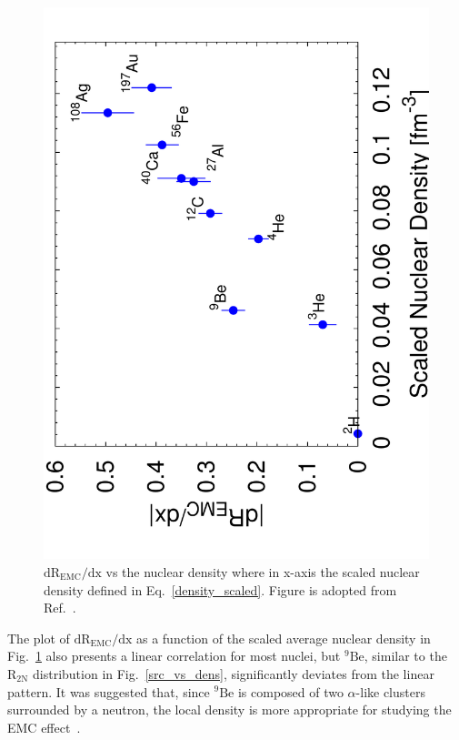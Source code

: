    \begin{figure}[!ht]
  \begin{center}
    \includegraphics[type=pdf,ext=.pdf,read=.pdf,angle=270,width=0.6\linewidth]{./figures/physics/emc_vs_dens_scaled}
   \caption[$\mathrm{dR_{EMC}/dx}$ vs nuclear density]{\footnotesize{$\mathrm{dR_{EMC}/dx}$ vs the nuclear density where in x-axis the scaled nuclear density defined in Eq.~\eqref{density_scaled}. Figure is adopted from Ref.~\cite{john_src_emc}.}}
    \label{emc_vs_dens}
  \end{center}
\end{figure} 
   The plot of $\mathrm{dR_{EMC}/dx}$ as a function of the scaled average nuclear density in Fig.~\ref{emc_vs_dens} also presents a linear correlation for most nuclei, but $\mathrm{^{9}Be}$, similar to the $\mathrm{R_{2N}}$ distribution in Fig.~\ref{src_vs_dens}, significantly deviates from the linear pattern. It was suggested that, since $\mathrm{^{9}Be}$ is composed of two $\alpha$-like clusters surrounded by a neutron, the local density is more appropriate for studying the EMC effect~\cite{PhysRevLett.103.202301}. 

